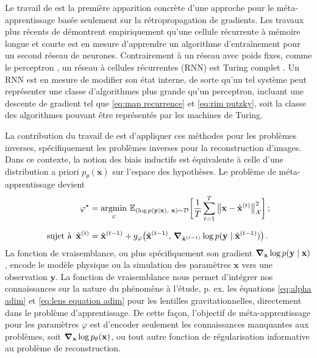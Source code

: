 Le travail de \citet{Younger2001} est la première apparition concrète d'une approche pour le méta-apprentissage 
basée seulement sur la rétropropagation de gradients.
Les travaux plus récents de \citet{Andrychowicz2016} 
démontrent empiriquement qu'une cellule récurrente à mémoire longue et courte \citep[LSTM,][]{Hochreiter1997} est en mesure d'apprendre 
un algorithme d'entraînement pour un second réseau de neurones. %
Contrairement à un réseau avec poids fixes, comme le perceptron \citep{Rosenblatt1958}, 
un réseau à cellules récurrentes (RNN) est Turing complet \citep{Siegelmann1992}.
Un RNN est en mesure de modifier son état interne, de sorte qu'un tel système peut représenter une classe d'algorithmes plus grande qu'un perceptron, 
incluant une descente de gradient tel que \eqref{eq:map recurrence} et \eqref{eq:rim putzky}, 
soit la classe des algorithmes pouvant être représentés par les machines de Turing.


La contribution du travail de \citet{Putzky2017} est d'appliquer ces méthodes pour les problèmes inverses, spécifiquement les 
problèmes inverses pour la reconstruction d'images. Dans ce contexte, la notion des biais inductifs est 
équivalente à celle d'une distribution a priori $p_\theta(\mathbf{x})$ sur l'espace 
des hypothèses. Le problème de méta-apprentissage devient
\begin{equation}\label{eq:loss intro}
        \begin{aligned}
                \varphi^{\star} &= \underset{\varphi}{\mathrm{argmin}}\,\, 
        \mathbb{E}_{(\log p(\mathbf{y} \mid \mathbf{x}),\,\, \mathbf{x}) \sim \mathcal{D}} 
        \bigg[ \frac{1}{T} \sum_{t=1}^{T} \big\lVert \mathbf{x} - \hat{\mathbf{x}}^{(t)} \big\rVert^{2}_{\mathcal{X}}  \bigg]\,; \\[1.5ex]
        \text{sujet à}\,\,\,\hat{\mathbf{x}}^{(t)} &= 
        \hat{\mathbf{x}}^{(t-1)} + g_\varphi\big(\hat{\mathbf{x}}^{(t-1)},\, \grad_{\hat{\mathbf{x}}^{(t-1)}} \log p(\mathbf{y} \mid \hat{\mathbf{x}}^{(t-1)}) \big)\, .
        \end{aligned}
\end{equation} 
La fonction de vraisemblance, ou plus spécifiquement son gradient $\grad_{\mathbf{x}}\log p(\mathbf{y} \mid \mathbf{x})$, 
encode le modèle physique ou la simulation des paramètres $\mathbf{x}$ vers une observation $\mathbf{y}$.
La fonction de vraisemblance nous permet d'intégrer nos connaissances sur la nature du phénomène à l'étude, 
p. ex. les équations \eqref{eq:alpha adim} et \eqref{eq:lens equation adim} 
pour les lentilles gravitationnelles, directement dans le problème d'apprentissage.
De cette façon, l'objectif de méta-apprentissage pour les paramètres $\varphi$ est d'encoder seulement 
les connaissances manquantes aux problèmes, soit $\grad_{\mathbf{x}}\log p_\theta(\mathbf{x})$, 
ou tout autre fonction de régularisation informative au problème de reconstruction.

